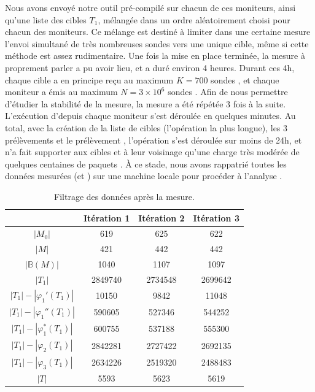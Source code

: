 Nous avons envoyé notre outil \udpping pré-compilé sur chacun de ces moniteurs,
ainsi qu'une liste des cibles $T_1$, mélangée dans un ordre aléatoirement choisi
pour chacun des moniteurs. Ce mélange est destiné à limiter dans une certaine
mesure l'envoi simultané de très nombreuses sondes vers une unique cible, même
si cette méthode est assez rudimentaire. Une fois la mise en place terminée, la
mesure \udpping à proprement parler a pu avoir lieu, et a duré environ 4
heures.
Durant ces 4h, chaque cible a en principe reçu au maximum $K = 700$ sondes
\udpping, et chaque moniteur a émis au maximum $N = 3 \times 10^6$ sondes
\udpping. Afin de nous permettre d'étudier la stabilité de la mesure, la mesure
\udpping a été répétée 3 fois à la suite. L'exécution d'\udpexplore depuis
chaque moniteur s'est déroulée en quelques minutes. Au total, avec la création
de la liste de cibles (l'opération la plus longue), les 3 prélèvements \udpping
et le prélèvement \udpexplore, l'opération s'est déroulée sur moins de 24h, et
n'a fait supporter aux cibles et à leur voisinage qu'une charge très modérée de
quelques centaines de paquets \udp. À ce stade, nous avons rappatrié toutes les
données mesurées (\udpping et \udpexplore) sur une machine locale pour procéder
à l'analyse \aposteriori.

\begin{table}[!ht]
\centering
\begin{tabular}{|c|c|c|c|}
\hline
										& Itération 1	& Itération 2	& Itération 3 \\
\hline
$|M_0|$									& 619			& 625			& 622 \\
\hline
$|M|$									& 421			& 442			& 442 \\
\hline
$|{\mathbb B}(M)|$						& 1040			& 1107			& 1097 \\
\hline
$|T_1|$									& 2849740		& 2734548 		& 2699642 \\
\hline
$|T_1| - |\varphi_1'(T_1)|$				& 10150			& 9842			& 11048 \\
\hline
$|T_1| - |\varphi_1''(T_1)|$			& 590605		& 527346		& 544252 \\
\hline 
$|T_1| - |\varphi_1^*(T_1)|$			& 600755		& 537188		& 555300 \\
\hline
$|T_1| - |\varphi_2(T_1)|$				& 2842281		& 2727422		& 2692135 \\
\hline
$|T_1| - |\varphi_3(T_1)|$				& 2634226		& 2519320		& 2488483 \\
\hline
$|T|$									& 5593			& 5623			& 5619 \\
\hline						
\end{tabular}
\caption[Filtrage des données après la mesure]{Filtrage des données après la
mesure.}
\label{table:udpping-measurement-filtering}
\end{table}

